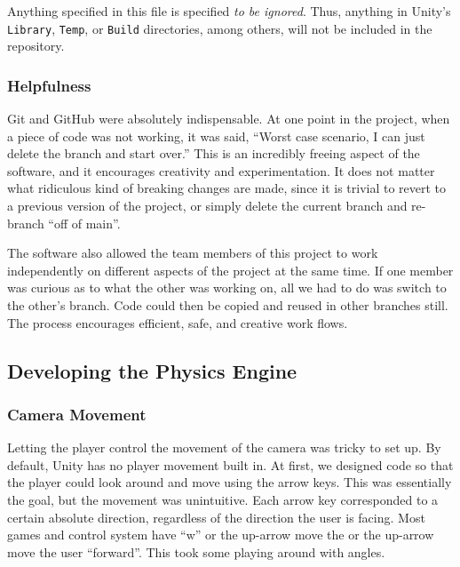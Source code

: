 \documentclass[12pt]{article}
\begin{document}
\inputminted[firstline=0,lastline=10,linenos,fontsize=\footnotesize,bgcolor=codebg]{text}{../.gitignore}

Anything specified in this file is specified \emph{to be ignored}. Thus, anything in Unity's \texttt{Library}, \texttt{Temp}, or \texttt{Build} directories, among others, will not be included in the repository.

\subsubsection{Helpfulness}
Git and GitHub were absolutely indispensable. At one point in the project, when a piece of code was not working, it was said, \enquote{Worst case scenario, I can just delete the branch and start over.} This is an incredibly freeing aspect of the software, and it encourages creativity and experimentation. It does not matter what ridiculous kind of breaking changes are made, since it is trivial to revert to a previous version of the project, or simply delete the current branch and re-branch \enquote{off of main}.

The software also allowed the team members of this project to work independently on different aspects of the project at the same time. If one member was curious as to what the other was working on, all we had to do was switch to the other's branch. Code could then be copied and reused in other branches still. The process encourages efficient, safe, and creative work flows.  


\subsection{Developing the Physics Engine}

\subsubsection{Camera Movement}

Letting the player control the movement of the camera was tricky to set up. By default, Unity has no player movement built in. At first, we designed code so that the player could look around and move using the arrow keys. This was essentially the goal, but the movement was unintuitive. Each arrow key corresponded to a certain absolute direction, regardless of the direction the user is facing. Most games and control system have \enquote{w} or the up-arrow move the or the up-arrow move the user \enquote{forward}. This took some playing around with angles.
\end{document}
